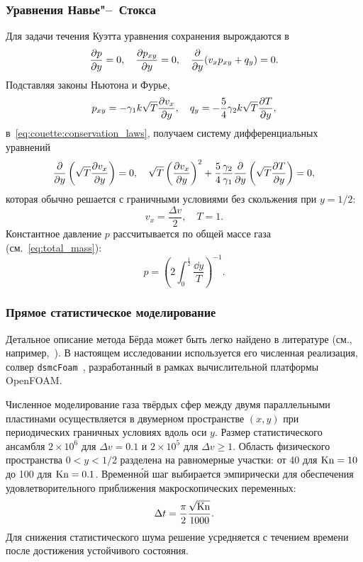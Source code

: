 \subsubsection{Уравнения Навье"--~Стокса}\label{sec:Navier-Stokes}

Для задачи течения Куэтта уравнения сохранения вырождаются в
\begin{equation}\label{eq:couette:conservation_laws}
    \pder[p]{y} = 0, \quad \pder[p_{xy}]{y} = 0, \quad \pder{y}(v_x p_{xy} + q_y) = 0.
\end{equation}
Подставляя законы Ньютона и Фурье,
\begin{equation}\label{eq:couette:Newton-Fourier}
    p_{xy} = -\gamma_1 k\sqrt{T}\pder[v_x]{y}, \quad q_y = -\frac54\gamma_2 k\sqrt{T}\pder[T]{y},
\end{equation}
в~\eqref{eq:couette:conservation_laws}, получаем систему дифференциальных уравнений
\begin{equation}\label{eq:couette:Navier-Stokes}
    \pder{y}\left(\sqrt{T}\pder[v_x]{y}\right) = 0, \quad
    \sqrt{T}\left(\pder[v_x]{y}\right)^2 + \frac54\frac{\gamma_2}{\gamma_1}\pder{y}\left(\sqrt{T}\pder[T]{y}\right) = 0,
\end{equation}
которая обычно решается с граничными условиями без скольжения при \(y=1/2\):
\begin{equation}\label{eq:couette:nonslip_bc}
    v_x = \frac{\Delta{v}}2, \quad T = 1.
\end{equation}
Константное давление \(p\) рассчитывается по общей массе газа (см.~\eqref{eq:total_mass}):
\begin{equation}\label{eq:couette:constant_pressure}
    p = \left( 2\int_{0}^\frac12\frac{\dd{y}}{T} \right)^{-1}.
\end{equation}

\subsubsection{Прямое статистическое моделирование}

Детальное описание метода Бёрда может быть легко найдено в литературе (см., например,~\cite{Bird1994, Sone2007}).
В настоящем исследовании используется его численная реализация, солвер \verb+dsmcFoam+~\cite{dsmcfoam},
разработанный в рамках вычислительной платформы OpenFOAM.

Численное моделирование газа твёрдых сфер между двумя параллельными пластинами осуществляется
в двумерном пространстве \((x,y)\) при периодических граничных условиях вдоль оси \(y\).
Размер статистического ансамбля \(2\times10^6\) для \(\Delta{v}=0.1\)
и \(2\times10^5\) для \(\Delta{v}\ge1\).
Область физического пространства \(0<y<1/2\) разделена на равномерные участки:
от 40 для \(\Kn=10\) до 100 для \(\Kn=0.1\).
Временн\'{о}й шаг выбирается эмпирически для обеспечения удовлетворительного приближения макроскопических переменных:
\begin{equation}\label{eq:dsmc_timestep}
    \Delta{t} = \frac{\pi}2 \frac{\sqrt{\Kn}}{1000}.
\end{equation}
Для снижения статистического шума решение усредняется с течением времени после достижения устойчивого состояния.

